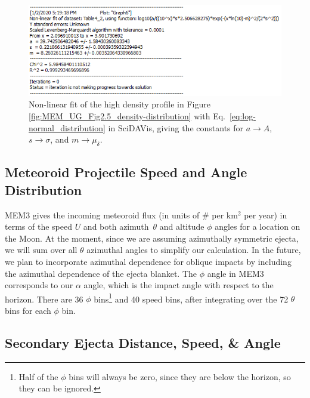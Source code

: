 \documentclass{hitec}
\numberwithin{equation}{section}
\begin{document}
\begin{figure}[h!]
	\centering
	\includegraphics[scale=0.85]{Fit-to-MEM_high_dens.PNG}
	\caption{Non-linear fit of the high density profile in Figure \ref{fig:MEM_UG_Fig2.5_density-distribution} with Eq.\ \ref{eq:log-normal_distribution} in \textsf{SciDAVis}, giving the constants for $a\rightarrow A$, $s\rightarrow \sigma$, and $m\rightarrow \mu_\delta$.}\label{fig:Fit-to-MEM_high_dens}
\end{figure}

\subsection{Meteoroid Projectile Speed and Angle Distribution}

MEM3 gives the incoming meteoroid flux (in units of \# per km$^2$ per year) in terms of the speed $U$ and both azimuth~$\theta$ and altitude $\phi$ angles for a location on the Moon. At the moment, since we are assuming azimuthally symmetric ejecta, we will sum over all $\theta$ azimuthal angles to simplify our calculation. In the future, we plan to incorporate azimuthal dependence for oblique impacts by including the azimuthal dependence of the ejecta blanket. The $\phi$ angle in MEM3 corresponds to our $\alpha$ angle, which is the impact angle with respect to the horizon. There are 36 $\phi$ bins\footnote{Half of the $\phi$ bins will always be zero, since they are below the horizon, so they can be ignored.} and 40 speed bins, after integrating over the 72 $\theta$ bins for each $\phi$ bin.


\subsection{Secondary Ejecta Distance, Speed, \& Angle}
\end{document}
